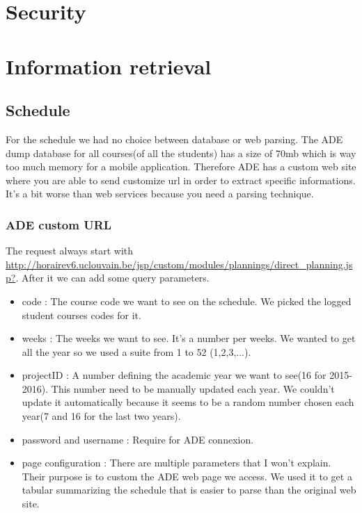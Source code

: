 \documentclass[11pt, a4paper]{report}
\begin{document}
\section{Security}

\section{Information retrieval}

\subsection{Schedule}
For the schedule we had no choice between database or web parsing. The ADE dump database for all courses(of all the students) has a size of 70mb which is way too much memory for a mobile application. Therefore ADE has a custom web site where you are able to send customize url in order to extract specific informations. It's a bit worse than web services because you need a parsing technique.
\subsubsection{ADE custom URL}
The request always start with \url{http://horairev6.uclouvain.be/jsp/custom/modules/plannings/direct_planning.jsp?}. After it we can add some query parameters.
\begin{itemize}
\item code : The course code we want to see on the schedule. We picked the logged student courses codes for it.
\item weeks : The weeks we want to see. It's a number per weeks. We wanted to get all the year so we used a suite from 1 to 52 (1,2,3,...).
\item projectID : A number defining the academic year we want to see(16 for 2015-2016). This number need to be manually updated each year. We couldn't update it automatically because it seems to be a random number chosen each year(7 and 16 for the last two years).
\item password and username : Require for ADE connexion.
\item page configuration : There are multiple parameters that I won't explain. Their purpose is to custom the ADE web page we access. We used it to get a tabular summarizing the schedule that is easier to parse than the original web site. 
\end{itemize}
\end{document}
